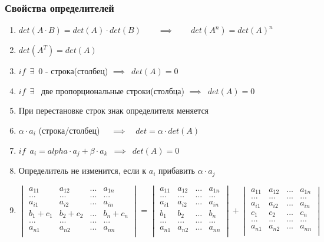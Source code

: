 \documentclass[12pt]{article}
\begin{document}
	\subsubsection{Свойства определителей}
	\begin{enumerate}
		\item $det(A \cdot B) = det(A) \cdot det(B) \qquad \implies \qquad det(A^n)=det(A)^n$
		\item $det(A^T) = det(A)$
		\item $if \enspace \exists \enspace 0$ - строка(столбец) $\implies \enspace det(A) = 0$
		\item $if \enspace \exists \enspace $ две пропорциональные строки(столбца) $\implies \enspace det(A) = 0$
		\item При перестановке строк знак определителя меняется
		\item $\alpha \cdot a_{i}$ (строка/столбец) $\quad \implies \quad det = \alpha \cdot det(A)$
		\item $if \enspace a_i=alpha \cdot a_j + \beta \cdot a_k \enspace \implies \enspace det(A) = 0$
		\item Определитель не изменится, если к $a_i$ прибавить $\alpha \cdot a_j$ \\
		\item $\begin{vmatrix}
		a_{11} & a_{12} & ... & a_{1n} \\
		... & ... & ... & ...\\
		a_{i1} & a_{i2} & ... & a_{in} \\
		b_1+c_1 & b_2+c_2 & ... & b_n + c_n\\
		... & ... & ... & ...\\
		a_{n1} & a_{n2} & ... & a_{nn} \\
	\end{vmatrix} = 
	\begin{vmatrix}
		a_{11} & a_{12} & ... & a_{1n} \\
		... & ... & ... & ...\\
		a_{i1} & a_{i2} & ... & a_{in} \\
		b_1 & b_2 & ... & b_n\\
		... & ... & ... & ...\\
		a_{n1} & a_{n2} & ... & a_{nn} \\
	\end{vmatrix} + 
	\begin{vmatrix}
		a_{11} & a_{12} & ... & a_{1n} \\
		... & ... & ... & ...\\
		a_{i1} & a_{i2} & ... & a_{in} \\
		c_1 & c_2 & ... & c_n\\
		... & ... & ... & ...\\
		a_{n1} & a_{n2} & ... & a_{nn} \\
	\end{vmatrix}$
	\end{enumerate}
\vspace{.5cm}
\end{document}
